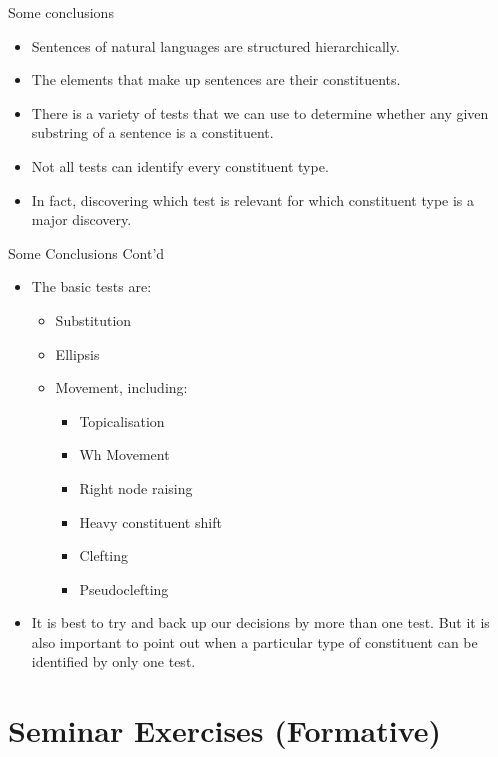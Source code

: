 \begin{frame}
  {Some conclusions}

  \begin{itemize}
  \item Sentences of natural languages are structured hierarchically.
  \item The elements that make up sentences are their constituents.
  \item There is a variety of tests that we can use to determine whether any given substring of a sentence is a constituent.
  \item Not all tests can identify every constituent type.
  \item In fact, discovering which test is relevant for which constituent type is a major discovery.
  \end{itemize}
\end{frame}

\begin{frame}
  {Some Conclusions Cont'd}

  \begin{itemize}
  \item The basic tests are:
    \begin{itemize}
    \item Substitution
    \item Ellipsis
    \item Movement, including:
      \begin{itemize}
      \item Topicalisation
      \item Wh Movement
      \item Right node raising
      \item Heavy constituent shift
     \item Clefting
      \item Pseudoclefting
      \end{itemize}
    \end{itemize}
\item It is best to try and back up our decisions by more than one test.  But it is also important to point out when a particular type of constituent can be identified by only one test.
  \end{itemize}



\end{frame}
\section{Seminar Exercises (Formative)}

